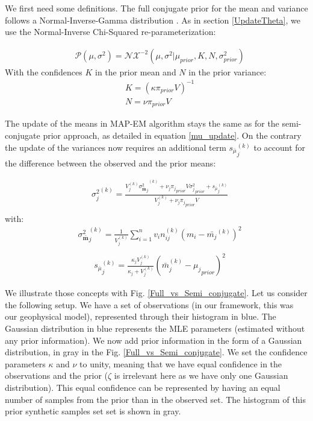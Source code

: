 We first need some definitions. The full conjugate prior for the mean and variance follows a Normal-Inverse-Gamma distribution \citep{Murphy:2012:MLP:2380985}. As in section \ref{UpdateTheta}, we use the Normal-Inverse Chi-Squared re-parameterization:

\begin{align}
&\mathcal{P}({\mu},\sigma^2) = \mathcal{N}\mathcal{X}^{-2}({\mu}, \sigma^2|{\mu}_{prior}, K, N,\sigma_{prior}^2) \label{mu_sigma_prior}
\end{align}
With the confidences $K$ in the prior mean and $N$ in the prior variance:
\begin{align}
&{K}=({\kappa}{\pi}_{prior}V)^{-1}\\
&{N}={\nu}{\pi}_{prior}V
\end{align}

The update of the means in MAP-EM algorithm stays the same as for the semi-conjugate prior approach, as detailed in equation \ref{mu_update}. On the contrary the update of the variances now requires an additional term ${s_{\bar{{\mu}}}}_j^{(k)}$ to account for the difference between the observed and the prior means:

\begin{align}
&{\sigma_j^2}^{(k)} = \frac{{{V_{j}^{(k)}} {\sigma^2_{\bar{\mathbf{m}}}}_j}^{(k)} + \nu_j {\pi_j}_{prior} V {\sigma_j^2}_{prior}+ {s_{\bar{{\mu}}}}_j^{(k)} }
{{V_{j}^{(k)}} + \nu_j {\pi_j}_{prior} V} \label{sig_update_full}\\
\end{align}
with:
\begin{align}
&{\sigma^2_{\bar{\mathbf{m}}}}_j^{(k)} =\frac{1}{{V_{j}^{(k)}}} \sum_{i=1}^{n} v_i n_{ij}^{(k)}({m}_i-\bar{{m}_j}^{(k)})^2\\
\end{align}
\begin{align}
&{s_{\bar{{\mu}}}}_j^{(k)} = \frac{\kappa_j V_{j}^{(k)} }{\kappa_j + V_{j}^{(k)}}(\bar{{m}}_j^{(k)}-{{\mu}_{j}}_{prior})^2 \label{full_additionalterm}
\end{align}

We illustrate those concepts with Fig. \ref{Full_vs_Semi_conjugate}. Let us consider the following setup. We have a set of observations (in our framework, this was our geophysical model), represented through their histogram in blue. The Gaussian distribution in blue represents the MLE parameters (estimated without any prior information). We now add prior information in the form of a Gaussian distribution, in gray in the Fig. \ref{Full_vs_Semi_conjugate}. We set the confidence parameters $\kappa$ and $\nu$ to unity, meaning that we have equal confidence in the observations and the prior ($\zeta$ is irrelevant here as we have only one Gaussian distribution). This equal confidence can be represented by having an equal number of samples from the prior than in the observed set. The histogram of this prior synthetic samples set set is shown in gray.

